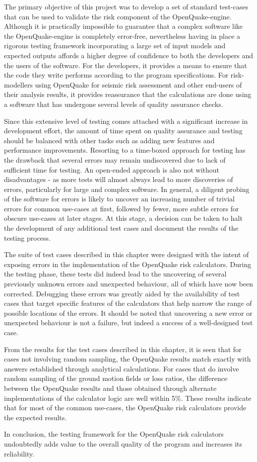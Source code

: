 The primary objective of this project was to develop a set of standard test-cases that can be used to validate the risk component of the OpenQuake-engine. Although it is practically impossible to guarantee that a complex software like the OpenQuake-engine is completely error-free, nevertheless having in place a rigorous testing framework incorporating a large set of input models and expected outputs affords a higher degree of confidence to both the developers and the users of the software. For the developers, it provides a means to ensure that the code they write performs according to the program specifications. For risk-modellers using OpenQuake for seismic risk assessment and other end-users of their analysis results, it provides reassurance that the calculations are done using a software that has undergone several levels of quality assurance checks.

Since this extensive level of testing comes attached with a significant increase in development effort, the amount of time spent on quality assurance and testing should be balanced with other tasks such as adding new features and performance improvements. Resorting to a time-boxed approach for testing has the drawback that several errors may remain undiscovered due to lack of sufficient time for testing. An open-ended approach is also not without disadvantages - as more tests will almost always lead to more discoveries of errors, particularly for large and complex software. In general, a diligent probing of the software for errors is likely to uncover an increasing number of trivial errors for common use-cases at first, followed by fewer, more subtle errors for obscure use-cases at later stages. At this stage, a decision can be taken to halt the development of any additional test cases and document the results of the testing process.

The suite of test cases described in this chapter were designed with the intent of exposing errors in the implementation of the OpenQuake risk calculators. During the testing phase, these tests did indeed lead to the uncovering of several previously unknown errors and unexpected behaviour, all of which have now been corrected. Debugging these errors was greatly aided by the availability of test cases that target specific features of the calculators that help narrow the range of possible locations of the errors. It should be noted that uncovering a new error or unexpected behaviour is not a failure, but indeed a success of a well-designed test case.

From the results for the test cases described in this chapter, it is seen that for cases not involving random sampling, the OpenQuake results match exactly with answers established through analytical calculations. For cases that do involve random sampling of the ground motion fields or loss ratios, the difference between the OpenQuake results and those obtained through alternate implementations of the calculator logic are well within 5\%. These results indicate that for most of the common use-cases, the OpenQuake risk calculators provide the expected results.

In conclusion, the testing framework for the OpenQuake risk calculators undoubtedly adds value to the overall quality of the program and increases its reliability.